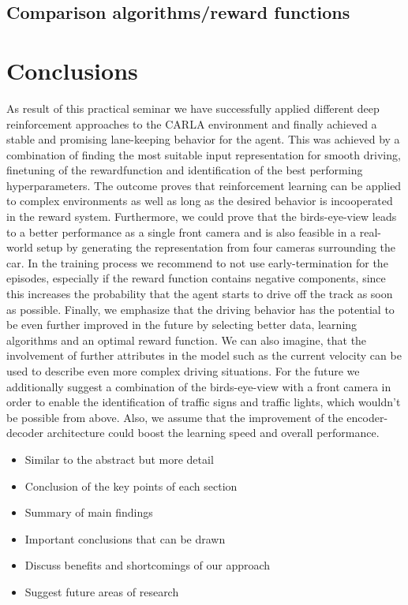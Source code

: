 \documentclass[letterpaper, 10 pt, conference]{ieeeconf}  %
\begin{document}
\subsection{Comparison algorithms/reward functions}

\section{Conclusions}
As result of this practical seminar we have successfully applied different deep reinforcement approaches to the CARLA environment and finally achieved a stable and promising lane-keeping behavior for the agent. This was achieved by a combination of finding the most suitable input representation for smooth driving, finetuning of the rewardfunction and identification of the best performing hyperparameters. The outcome proves that reinforcement learning can be applied to complex environments as well as long as the desired behavior is incooperated in the reward system. Furthermore, we could prove that the birds-eye-view leads to a better performance as a single front camera and is also feasible in a real-world setup by generating the representation from four cameras surrounding the car. In the training process we recommend to not use early-termination for the episodes, especially if the reward function contains negative components, since this increases the probability that the agent starts to drive off the track as soon as possible. Finally, we emphasize that the driving behavior has the potential to be even further improved in the future by selecting better data, learning algorithms and an optimal reward function. We can also imagine, that the involvement of further attributes in the model such as the current velocity can be used to describe even more complex driving situations.  \newline
For the future we additionally suggest a combination of the birds-eye-view with a front camera in order to enable the identification of traffic signs and traffic lights, which wouldn't be possible from above. Also, we assume that the improvement of the encoder-decoder architecture could boost the learning speed and overall performance.




\begin{itemize}
      \item Similar to the abstract but more detail
      \item Conclusion of the key points of each section
      \item Summary of main findings
      \item Important conclusions that can be drawn
      \item Discuss benefits and shortcomings of our approach
      \item Suggest future areas of research
   \end{itemize}
\end{document}
